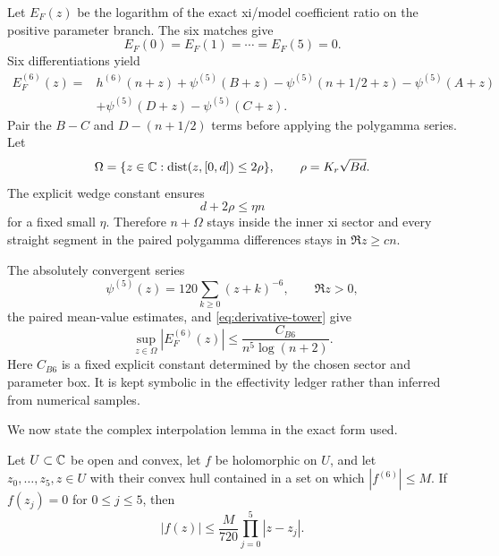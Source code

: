 \documentclass[12pt]{article}
\begin{document}
Let $E_F(z)$ be the logarithm of the exact xi/model coefficient ratio on the
positive parameter branch.  The six matches give
\begin{equation}\label{eq:E-nodes}
 E_F(0)=E_F(1)=\cdots=E_F(5)=0.
\end{equation}
Six differentiations yield
\begin{align}
 E_F^{(6)}(z)={}&h^{(6)}(n+z)+\psi^{(5)}(B+z)
 -\psi^{(5)}(n+1/2+z)-\psi^{(5)}(A+z)\nonumber\\
 &+\psi^{(5)}(D+z)-\psi^{(5)}(C+z).
 \label{eq:E6-exact}
\end{align}
Pair the $B-C$ and $D-(n+1/2)$ terms before applying the polygamma series.
Let
\begin{equation}\label{eq:Omega}
 \Omega=\{z\in\mathbb C:\operatorname{dist}(z,[0,d])\le2\rho\},
 \qquad \rho=K_r\sqrt{Bd}.
\end{equation}
The explicit wedge constant ensures
\begin{equation}\label{eq:domain-containment}
 d+2\rho\le\eta n
\end{equation}
for a fixed small $\eta$.  Therefore $n+\Omega$ stays inside the inner xi
sector and every straight segment in the paired polygamma differences stays
in $\Re z\ge cn$.

The absolutely convergent series
\begin{equation}\label{eq:polygamma-series}
 \psi^{(5)}(z)=120\sum_{k\ge0}(z+k)^{-6},
 \qquad \Re z>0,
\end{equation}
the paired mean-value estimates, and \eqref{eq:derivative-tower} give
\begin{equation}\label{eq:E6}
 \sup_{z\in\Omega}|E_F^{(6)}(z)|
 \le\frac{C_{B6}}{n^5\log(n+2)}.
\end{equation}
Here $C_{B6}$ is a fixed explicit constant determined by the chosen sector
and parameter box.  It is kept symbolic in the effectivity ledger rather
than inferred from numerical samples.

We now state the complex interpolation lemma in the exact form used.

\begin{lemma}\label{lem:HG}
Let $U\subset\mathbb C$ be open and convex, let $f$ be holomorphic on $U$, and let
$z_0,\ldots,z_5,z\in U$ with their convex hull contained in a set on which
$|f^{(6)}|\le M$.  If $f(z_j)=0$ for $0\le j\le5$, then
\begin{equation}\label{eq:HG}
 |f(z)|\le\frac{M}{720}\prod_{j=0}^{5}|z-z_j|.
\end{equation}
\end{lemma}
\end{document}
